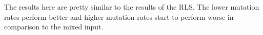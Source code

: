 The results here are pretty similar to the results of the RLS.
The lower mutation rates perform better and higher mutation rates start to perform worse in comparison to the mixed input.